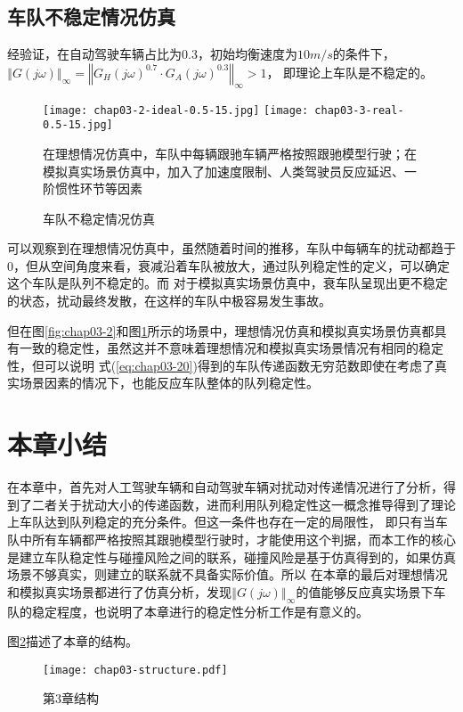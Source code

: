 \subsection{车队不稳定情况仿真}
\label{sec:3.4.2}

经验证，在自动驾驶车辆占比为0.3，初始均衡速度为$10m/s$的条件下，$\left\Vert G(j\omega) \right\Vert_{\infty} = \left\Vert G_H(j\omega)^{0.7} \cdot G_A(j\omega)^{0.3} \right\Vert_{\infty} > 1$，
即理论上车队是不稳定的。

\begin{figure}
  \centering
    {\texttt{[image: chap03-2-ideal-0.5-15.jpg]}}
    {\texttt{[image: chap03-3-real-0.5-15.jpg]}}
    \caption*{在理想情况仿真中，车队中每辆跟驰车辆严格按照跟驰模型行驶；在模拟真实场景仿真中，加入了加速度限制、人类驾驶员反应延迟、一阶惯性环节等因素}
    \caption{车队不稳定情况仿真}
  \label{fig:chap03-3}
\end{figure}

可以观察到在理想情况仿真中，虽然随着时间的推移，车队中每辆车的扰动都趋于0，但从空间角度来看，衰减沿着车队被放大，通过队列稳定性的定义，可以确定这个车队是队列不稳定的。而
对于模拟真实场景仿真中，衰车队呈现出更不稳定的状态，扰动最终发散，在这样的车队中极容易发生事故。

但在图\ref{fig:chap03-2}和图\ref{fig:chap03-3}所示的场景中，理想情况仿真和模拟真实场景仿真都具有一致的稳定性，虽然这并不意味着理想情况和模拟真实场景情况有相同的稳定性，但可以说明
式(\ref{eq:chap03-20})得到的车队传递函数无穷范数即使在考虑了真实场景因素的情况下，也能反应车队整体的队列稳定性。

\section{本章小结}
在本章中，首先对人工驾驶车辆和自动驾驶车辆对扰动对传递情况进行了分析，得到了二者关于扰动大小的传递函数，进而利用队列稳定性这一概念推导得到了理论上车队达到队列稳定的充分条件。但这一条件也存在一定的局限性，
即只有当车队中所有车辆都严格按照其跟驰模型行驶时，才能使用这个判据，而本工作的核心是建立车队稳定性与碰撞风险之间的联系，碰撞风险是基于仿真得到的，如果仿真场景不够真实，则建立的联系就不具备实际价值。所以
在本章的最后对理想情况和模拟真实场景都进行了仿真分析，发现$\left\Vert G(j\omega) \right\Vert_{\infty}$的值能够反应真实场景下车队的稳定程度，也说明了本章进行的稳定性分析工作是有意义的。

图\ref{fig:chap03-4}描述了本章的结构。

\begin{figure}
  \centering
  \texttt{[image: chap03-structure.pdf]}
  \caption{第3章结构}
  \label{fig:chap03-4}
\end{figure}